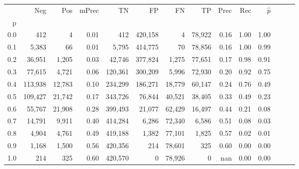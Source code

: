 \begin{tabular}{rrrrrrrrrrrrrr}
\toprule
{} &      Neg &     Pos & mPrec &       TN &       FP &      FN &      TP &  Prec &   Rec & $\hat{p}$ \\
p   &          &         &       &          &          &         &         &       &       &           \\
\midrule
0.0 &      412 &       4 &  0.01 &      412 &  420,158 &       4 &  78,922 &  0.16 &  1.00 &      1.00 \\
0.1 &    5,383 &      66 &  0.01 &    5,795 &  414,775 &      70 &  78,856 &  0.16 &  1.00 &      0.99 \\
0.2 &   36,951 &   1,205 &  0.03 &   42,746 &  377,824 &   1,275 &  77,651 &  0.17 &  0.98 &      0.91 \\
0.3 &   77,615 &   4,721 &  0.06 &  120,361 &  300,209 &   5,996 &  72,930 &  0.20 &  0.92 &      0.75 \\
0.4 &  113,938 &  12,783 &  0.10 &  234,299 &  186,271 &  18,779 &  60,147 &  0.24 &  0.76 &      0.49 \\
0.5 &  109,427 &  21,742 &  0.17 &  343,726 &   76,844 &  40,521 &  38,405 &  0.33 &  0.49 &      0.23 \\
0.6 &   55,767 &  21,908 &  0.28 &  399,493 &   21,077 &  62,429 &  16,497 &  0.44 &  0.21 &      0.08 \\
0.7 &   14,791 &   9,911 &  0.40 &  414,284 &    6,286 &  72,340 &   6,586 &  0.51 &  0.08 &      0.03 \\
0.8 &    4,904 &   4,761 &  0.49 &  419,188 &    1,382 &  77,101 &   1,825 &  0.57 &  0.02 &      0.01 \\
0.9 &    1,168 &   1,500 &  0.56 &  420,356 &      214 &  78,601 &     325 &  0.60 &  0.00 &      0.00 \\
1.0 &      214 &     325 &  0.60 &  420,570 &        0 &  78,926 &       0 &   nan &  0.00 &      0.00 \\
\bottomrule
\end{tabular}
